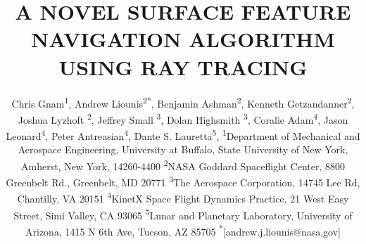 \documentclass{RPI-SIW}
\begin{document}
\title{A NOVEL SURFACE FEATURE NAVIGATION ALGORITHM USING RAY
TRACING}

\author{
    Chris Gnam\textsuperscript{1},
	Andrew Liounis\textsuperscript{2}\textsuperscript{*},
    Benjamin Ashman\textsuperscript{2},
    Kenneth Getzandanner\textsuperscript{2},
    Joshua Lyzhoft \textsuperscript{2},
    Jeffrey Small \textsuperscript{3},
    Dolan Highsmith \textsuperscript{3},
    Coralie Adam\textsuperscript{4},
    Jason Leonard\textsuperscript{4},
    Peter Antreasian\textsuperscript{4},
    Dante S. Lauretta\textsuperscript{5},
	\textsuperscript{1}Department of Mechanical and Aerospace Engineering, University at Buffalo, State University of New York, Amherst, New York, 14260-4400
    \textsuperscript{2}NASA Goddard Spaceflight Center, 8800 Greenbelt Rd., Greenbelt, MD 20771
    \textsuperscript{3}The Aerospace Corporation, 14745 Lee Rd, Chantilly, VA 20151
    \textsuperscript{4}KinetX Space Flight Dynamics Practice, 21 West Easy Street, Simi Valley, CA 93065
    \textsuperscript{5}Lunar and Planetary Laboratory, University of Arizona, 1415 N 6th Ave, Tucson, AZ 85705
    \textsuperscript{*}[andrew.j.liounis@nasa.gov]
}

\maketitle{}

\end{document}
